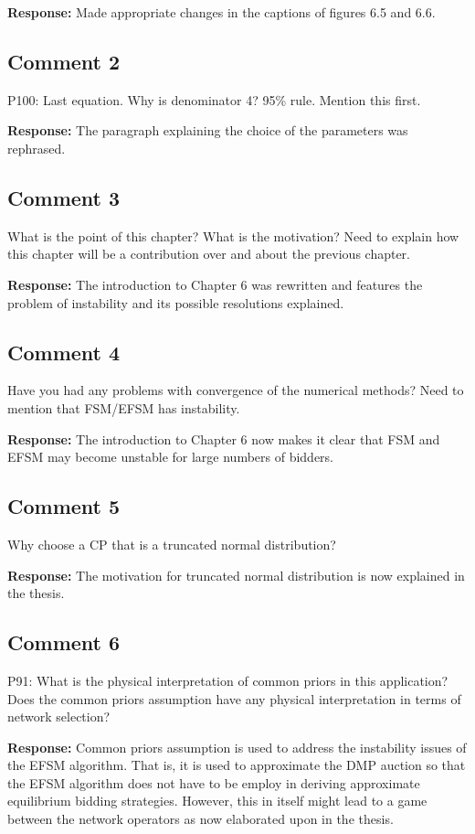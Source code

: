 \documentclass[10pt,a4paper,notitlepage]{article}
\numberwithin{equation}{section}
\begin{document}
\textbf{Response:}
Made appropriate changes in the captions of figures 6.5 and 6.6.

\subsection{Comment 2}
P100: Last equation. Why is denominator 4? 95\% rule. Mention this first.

\textbf{Response:}
The paragraph explaining the choice of the parameters was rephrased.

\subsection{Comment 3}
What is the point of this chapter? What is the motivation? Need to explain how this chapter will be a contribution over and about the previous chapter.

\textbf{Response:}
The introduction to Chapter 6 was rewritten and features the problem of instability and its possible resolutions explained.

\subsection{Comment 4}
Have you had any problems with convergence of the numerical methods? Need to mention that FSM/EFSM has instability.

\textbf{Response:}
The introduction to Chapter 6 now makes it clear that FSM and EFSM may become unstable for large numbers of bidders.

\subsection{Comment 5}
Why choose a CP that is a truncated normal distribution?

\textbf{Response:}
The motivation for truncated normal distribution is now explained in the thesis.

\subsection{Comment 6}
P91: What is the physical interpretation of common priors in this application? Does the common priors assumption have any physical interpretation in terms of network selection?

\textbf{Response:}
Common priors assumption is used to address the instability issues of the EFSM algorithm. That is, it is used to approximate the DMP auction so that the EFSM algorithm does not have to be employ in deriving approximate equilibrium bidding strategies. However, this in itself might lead to a game between the network operators as now elaborated upon in the thesis.
\end{document}
